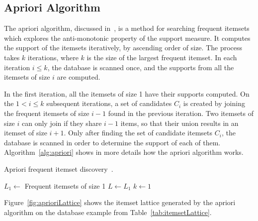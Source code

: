 \subsection{Apriori Algorithm}
The apriori algorithm, discussed in~\citet{Agrawal:1994:FAM:645920.672836}, is a method for searching frequent itemsets
which explores the anti-monotonic property of the support measure. It computes the support of the itemsets iteratively,
by ascending order of size. The process takes $k$ iterations, where $k$ is the size of the largest frequent itemset. In
each iteration $i \leq k$, the database is scanned once, and the supports from all the itemsets of size $i$ are
computed.

In the first iteration, all the itemsets of size 1 have their supports computed. On the $1 < i \leq k$ subsequent
iterations, a set of candidates $C_i$ is created by joining the frequent itemsets of size $i-1$ found in the previous
iteration. Two itemsets of size $i$ can only join if they share $i-1$ items, so that their union results in an itemset
of size $i+1$. Only after finding the set of candidate itemsets $C_i$, the database is scanned in order to determine the
support of each of them. Algorithm~\ref{alg:apriori} shows in more details how the apriori algorithm works.

\begin{algorithm}[h!]
  \caption{Apriori frequent itemset discovery~\citep{Pasquier99efficientmining}.}

  $L_1 \leftarrow$ Frequent itemsets of size 1 \;
  $L \leftarrow L_1$ \;
  $k \leftarrow 1$ \;
   \;
 \label{alg:apriori}
\end{algorithm}

Figure~\ref{fig:aprioriLattice} shows the itemset lattice generated by the apriori algorithm on the database
example from Table~\ref{tab:itemsetLattice}.


